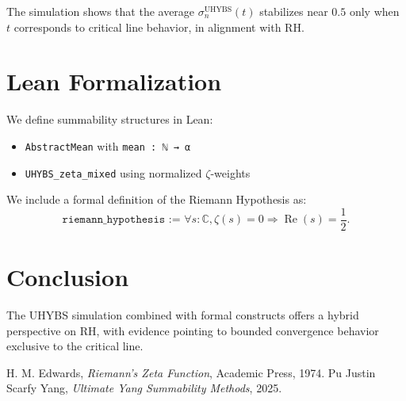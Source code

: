 \documentclass{amsart}
\begin{document}
The simulation shows that the average $\sigma_n^{\text{UHYBS}}(t)$ stabilizes near $0.5$ only when $t$ corresponds to critical line behavior, in alignment with RH.

\section{Lean Formalization}
We define summability structures in Lean:
\begin{itemize}
  \item \texttt{AbstractMean} with \texttt{mean : ℕ → α}
  \item \texttt{UHYBS\_zeta\_mixed} using normalized $\zeta$-weights
\end{itemize}
We include a formal definition of the Riemann Hypothesis as:
\[
\texttt{riemann\_hypothesis := } \forall s : \mathbb{C}, \zeta(s) = 0 \Rightarrow \operatorname{Re}(s) = \frac{1}{2}.
\]

\section{Conclusion}
The UHYBS simulation combined with formal constructs offers a hybrid perspective on RH, with evidence pointing to bounded convergence behavior exclusive to the critical line.

\begin{thebibliography}{9}
 H. M. Edwards, \textit{Riemann's Zeta Function}, Academic Press, 1974.
 Pu Justin Scarfy Yang, \textit{Ultimate Yang Summability Methods}, 2025.
\end{thebibliography}
\end{document}
